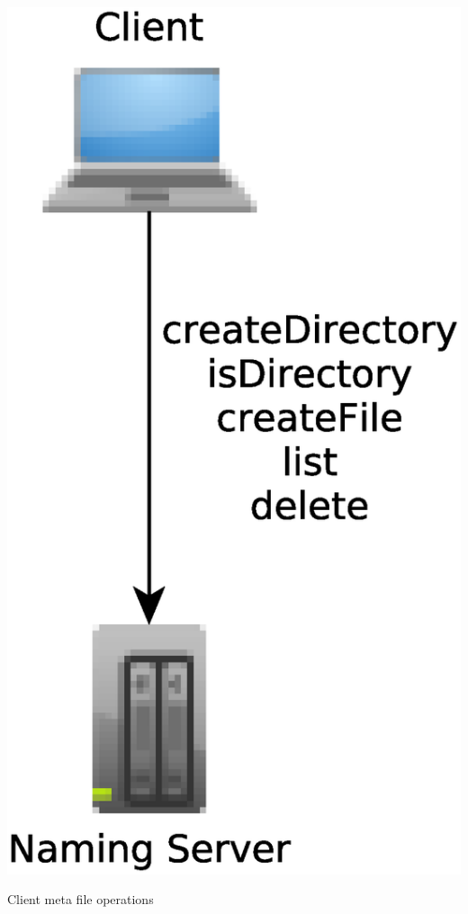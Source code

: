 \documentclass [10pt, a4paper]{article}
\begin{document}
\begin {diagram}
\begin {center}
\includegraphics[scale=0.2]{naming-client.eps}
\end {center}
\caption {Client meta file operations}
\end {diagram}

\newpage
\end{document}
